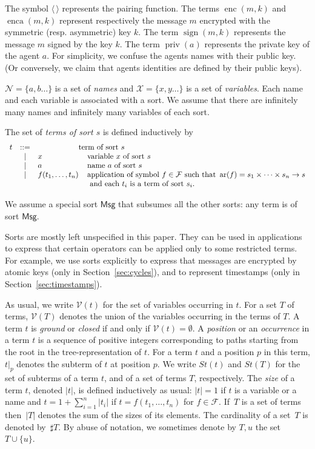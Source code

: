\documentclass[acmtocl,acmnow]{acmtrans2m}
\newcommand{\card}[1]{\sharp{#1}}
\newcommand{\var}{\mathcal{V}}
\newcommand{\set}[1]{\lbrace{#1}\rbrace}
\newcommand{\st}{\mathit{St}}
\newcommand{\enc}{\operatorname{enc}}
\newcommand{\enca}{\operatorname{enca}}
\newcommand{\sign}{\operatorname{sign}}
\newcommand{\priv}{\operatorname{priv}}
\newcommand{\ar}{\operatorname{ar}}
\newcommand{\term}{\mathsf{Msg}}
\begin{document}
 The symbol $\langle\,\rangle$ represents the pairing function. The
terms $\enc(m,k)$ and $\enca(m,k)$  represent respectively the message $m$ encrypted with the symmetric
(resp. asymmetric) key $k$. The term $\sign(m,k)$ represents the message $m$ signed by the key $k$. The
term $\priv(a)$ represents the private key of the agent $a$. For simplicity,
we confuse the agents names with their public key. (Or conversely, we claim
that agents identities are defined by their public keys).

 $\mathcal{N} = \{a,b\ldots\}$ is a set of \emph{names} and $\mathcal{X}=\{x,y\ldots\}$ is
a set of \emph{variables}. Each name and each variable is associated with 
a sort. We assume that there are infinitely many names and infinitely
many variables of each sort.


The set of
\emph{terms of sort $s$} is defined inductively by
$$\begin{array}{lcl@{\hspace{0.4cm}}l}
  t & ::= & & \hspace{-0.4cm} \text{term of sort }s\\
  & | & x & \text{variable } x \text{ of sort } s\\& | & a & \text{name } a \text{ of sort } s\\& | & f(t_1,\ldots,t_n) & \text{application of symbol }f \in
  \mathcal{F} \text{ such that } \ar(f) = s_1\times \cdots \times s_n \rightarrow s\\ &&&
\text{ and each } t_i \text{ is a term of sort } s_i.
\end{array}$$

We assume a special sort $\term$ that
subsumes all the other sorts: any term is of sort $\term$.

Sorts are mostly left unspecified in this paper. They can be used in
applications to express that certain operators can be applied only
to some restricted terms.
For example, we use sorts explicitly to express that messages are encrypted by atomic keys (only in Section~\ref{sec:cycles}),
and to represent timestamps (only in Section~\ref{sec:timestamps}).


As usual, we write $\var(t)$ for the set of variables occurring in $t$. For a  set $T$ of terms, $\var(T)$ denotes the union of the variables occurring in the terms of $T$.
A term $t$ is \emph{ground} or \emph{closed} if and only if $\var(t)=\emptyset$.
A \emph{position} or an \emph{occurrence} in a term $t$ is a sequence of positive integers corresponding
to paths starting from the root in the tree-representation of $t$.
For a term $t$ and a position $p$ in this term, $t|_{p}$ denotes the  subterm of $t$ at
position $p$.
We write $\st(t)$ and $\st(T)$ for the set of subterms of a term $t$,
and of a set of terms $T$, respectively.  The \emph{size} of a term
$t$, denoted $|t|$, is defined inductively as usual: $|t|=1$ if $t$ is
a variable or a name and $t=1+\sum_{i=1}^n|t_i|$ if
$t=f(t_1,\dots,t_n)$ for $f\in\mathcal{F}$.  If~$T$ is a set of terms
then~$|T|$ denotes the sum of the sizes of its elements. The
cardinality of a set~$T$ is denoted by~$\card{T}$. By abuse of
notation, we sometimes denote by $T,u$ the set $T\cup\set{u}$.
\end{document}
